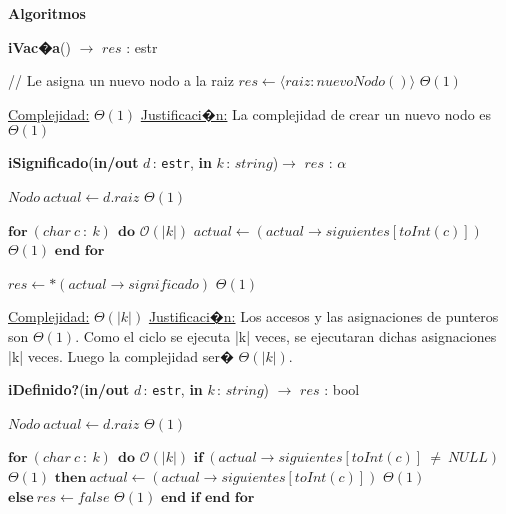 \documentclass[a4paper,10pt]{article}
\let\TipoVariable=\texttt
\let\ModificadorArgumento=\textbf
\newcommand{\tab}{\hspace*{7mm}}
\newcommand{\ttab}{\tab \tab}
\newcommand{\In}[2]{\ModificadorArgumento{in} \ensuremath{#1}\,: \TipoVariable{#2}\xspace}
\newcommand{\Inout}[2]{\ModificadorArgumento{in/out} \ensuremath{#1}\,: \TipoVariable{#2}\xspace}
\newenvironment{Algoritmos}{%
  \vspace*{2ex}%
  \noindent\textbf{\Large Algoritmos}%
  \vspace*{2ex}%
}{}
\newcommand{\DRef}{\ensuremath{\rightarrow}}
\newcommand{\BigO}{\ensuremath{\mathcal{O}}}
\newcommand{\tuple}[1]{\langle #1 \rangle}
\begin{document}
{\begin{Algoritmos}
    \begin{algorithm}[H]{\textbf{iVac�a}() $\to$ $res$ : estr}
      \begin{algorithmic}[1]
           \State // Le asigna un nuevo nodo a la raiz
           \State $res \gets \tuple{raiz: nuevoNodo()}$				\Comment $\Theta(1)$
    
          \medskip
          \Statex \underline{Complejidad:} $\Theta(1)$
          \Statex \underline{Justificaci�n:} La complejidad de crear un nuevo nodo es $\Theta(1)$
          \end{algorithmic}
    \end{algorithm}

    \begin{algorithm}[H]{\textbf{iSignificado}(\Inout{d}{estr}, \In{k}{$string$})$\to$ $res$ : $\alpha$}
      \begin{algorithmic}[1]
        \State $Nodo \ actual \gets d.raiz$                                                      \Comment $\Theta(1)$

        \State $\textbf{for} \ (char \ c \ : \ k) \ \ \textbf{do}$                               \Comment $\BigO(|k|)$  
        \State \tab $actual \gets (actual \DRef siguientes [toInt(c)])$       \Comment $\Theta(1)$
        \State $\textbf{end for}$                                    

        \State $res \gets *(actual \DRef significado)$                                            \Comment $\Theta(1)$

          \medskip
          \Statex \underline{Complejidad:} $\Theta(|k|)$
          \Statex \underline{Justificaci�n:} Los accesos y las asignaciones de punteros son $\Theta(1)$. Como el ciclo se ejecuta |k| veces, se ejecutaran dichas asignaciones |k| veces. Luego la complejidad ser� $\Theta(|k|)$.
          \end{algorithmic}
    \end{algorithm}


    \begin{algorithm}[H]{\textbf{iDefinido?}(\Inout{d}{estr}, \In{k}{$string$}) $\to$ $res$ : bool}
      \begin{algorithmic}[1]
           \State $Nodo \ actual \gets d.raiz$                                                      \Comment $\Theta(1)$

           \State $\textbf{for} \ (char \ c \ : \ k) \ \ \textbf{do}$                               \Comment $\BigO(|k|)$  
           \State \tab  $\textbf{if} \ (actual \DRef siguientes [toInt(c)] \ \neq  \ NULL) $        \Comment $\Theta(1)$
           \State \ttab   $\textbf{then} \ actual \gets (actual \DRef siguientes [toInt(c)])$       \Comment $\Theta(1)$
           \State \ttab  $\textbf{else} \ res \gets false$                                           \Comment $\Theta(1)$
           \State \tab $\textbf{end if}$
           \State $\textbf{end for}$                                    


\end{algorithmic}
\end{algorithm}
\end{Algoritmos}}
\end{document}
